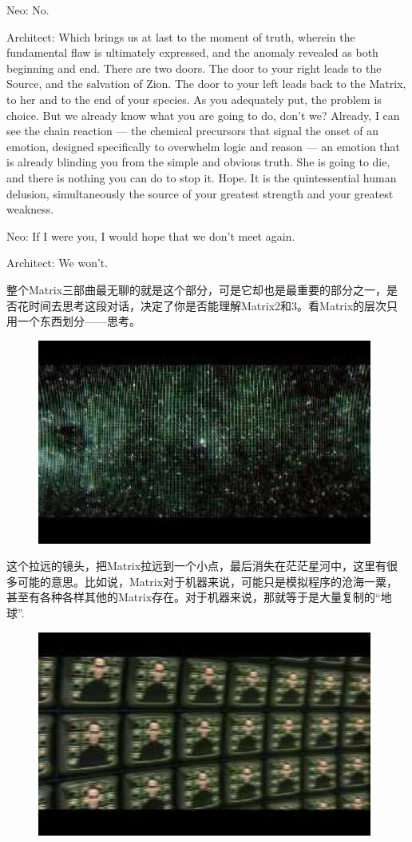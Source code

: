 \documentclass[UTF8]{ctexart}
\newenvironment{myquote}{\color{green} \setlength{\leftskip}{6em} \setlength{\rightskip}{4em} \setlength{\parindent}{-2em}}{\par}
\begin{document}
\begin{myquote}
Neo: No.

Architect: Which brings us at last to the moment of truth, wherein the fundamental flaw is ultimately expressed, and the anomaly revealed as both beginning and end. There are two doors. The door to your right leads to the Source, and the salvation of Zion. The door to your left leads back to the Matrix, to her and to the end of your species. As you adequately put, the problem is choice. But we already know what you are going to do, don't we? Already, I can see the chain reaction --- the chemical precursors that signal the onset of an emotion, designed specifically to overwhelm logic and reason --- an emotion that is already blinding you from the simple and obvious truth. She is going to die, and there is nothing you can do to stop it. Hope. It is the quintessential human delusion, simultaneously the source of your greatest strength and your greatest weakness.

Neo: If I were you, I would hope that we don't meet again.

Architect: We won't.
\end{myquote}

整个Matrix三部曲最无聊的就是这个部分，可是它却也是最重要的部分之一，是否花时间去思考这段对话，决定了你是否能理解Matrix2和3。看Matrix的层次只用一个东西划分——思考。

\begin{figure}[htb]
\centering
\includegraphics[width=0.5\linewidth]{fig/read_reloaded-156}
\end{figure}

这个拉远的镜头，把Matrix拉远到一个小点，最后消失在茫茫星河中，这里有很多可能的意思。比如说，Matrix对于机器来说，可能只是模拟程序的沧海一粟，甚至有各种各样其他的Matrix存在。对于机器来说，那就等于是大量复制的“地球”.

\begin{figure}[htb]
\centering
\includegraphics[width=0.5\linewidth]{fig/read_reloaded-157}
\end{figure}
\end{document}
